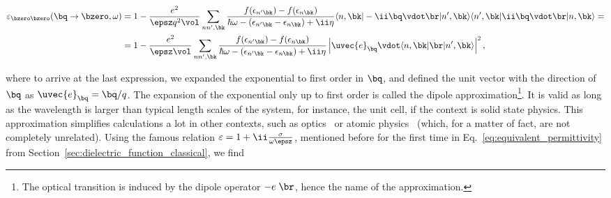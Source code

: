 \begin{align}
    \varepsilon_{\bzero\bzero}(\bq\to\bzero,\omega) &= 1-\frac{e^{2}}{\epsz q^{2} \vol}
    \sum_{nn',\bk}\frac{f(\epsilon_{n' \bk}) - f(\epsilon_{n \bk})}{\hbar \omega - (\epsilon_{n' \bk} - \epsilon_{n \bk}) + \ii \eta}\langle n,\bk|-\ii \bq \vdot \br |n',\bk\rangle\langle n',\bk|\ii \bq \vdot \br|n,\bk\rangle= \notag \\ %
    &=1-\frac{e^{2}}{\epsz \vol}\sum_{nn',\bk}\frac{f(\epsilon_{n' \bk}) - f(\epsilon_{n \bk})}{\hbar \omega - (\epsilon_{n' \bk} - \epsilon_{n \bk}) + \ii \eta}\left|\uvec{e}_{\bq}\vdot\langle n,\bk|\br|n',\bk\rangle\right|^2 ,
\end{align}


\noindent where to arrive at the last expression, we expanded the exponential to first order in $\bq$, and defined the unit vector with the direction of $\bq$ as $\uvec{e}_{\bq}=\bq/q$.
The expansion of the exponential only up to first order is called the dipole approximation\footnote{The optical transition is induced by the dipole operator $-e\phantom{.}\br$, hence the name of the approximation.}.
It is valid as long as the wavelength is larger than typical length scales of the system, for instance, the unit cell, if the context is solid state physics.
This approximation simplifies calculations a lot in other contexts, such as optics~\cite{Hohenester_2020,Novotny_Hecht_2012,Agarwal_2012} or atomic physics~\cite{Sakurai,Zettili_2009,Foot_2004} (which, for a matter of fact, are not completely unrelated).
Using the famous relation $\varepsilon=1+\ii\frac{\sigma}{\omega\epsz}$, mentioned before for the first time in Eq.~\eqref{eq:equivalent_permittivity} from Section~\ref{sec:dielectric_function_classical}, we find

